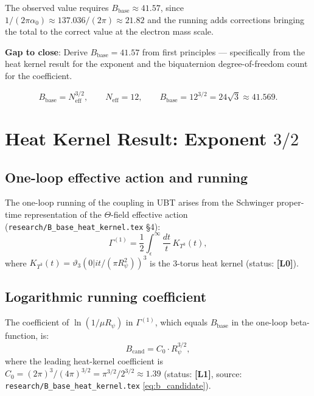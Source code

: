 \documentclass[11pt,a4paper]{article}
\newcommand{\Lzero}{\textbf{[L0]}}
\newcommand{\Lone}{\textbf{[L1]}}
\begin{document}
The observed value requires $B_{\mathrm{base}}\approx 41.57$, since
$1/(2\pi\alpha_0)\approx 137.036/(2\pi)\approx 21.82$ and the running
adds corrections bringing the total to the correct value at the electron
mass scale.

\medskip
\noindent\textbf{Gap to close}: Derive $B_{\mathrm{base}} = 41.57$ from first
principles — specifically from the heat kernel result for the exponent and
the biquaternion degree-of-freedom count for the coefficient.

\begin{tcolorbox}[colback=blue!5!white,colframe=blue!50!black,
  title=Main Result (proved at level \Lone)]
  \[
    B_{\mathrm{base}}
    = N_{\mathrm{eff}}^{3/2},
    \qquad
    N_{\mathrm{eff}} = 12,
    \qquad
    B_{\mathrm{base}} = 12^{3/2} = 24\sqrt{3} \approx 41.569.
  \]
\end{tcolorbox}

\section{Heat Kernel Result: Exponent $3/2$}
\label{sec:heat_kernel}

\subsection{One-loop effective action and running}

The one-loop running of the coupling in UBT arises from the Schwinger
proper-time representation of the $\Theta$-field effective action
(\texttt{research/B\_base\_heat\_kernel.tex} §4):
\begin{equation}
\label{eq:schwinger}
  \Gamma^{(1)}
  = \frac{1}{2}\int_\epsilon^\infty \frac{dt}{t}\,K_{T^3}(t),
\end{equation}
where $K_{T^3}(t)=\vartheta_3(0|it/(\pi R_\psi^2))^3$ is the 3-torus
heat kernel (status: \Lzero).

\subsection{Logarithmic running coefficient}

The coefficient of $\ln(1/\mu R_\psi)$ in $\Gamma^{(1)}$, which equals
$B_{\mathrm{base}}$ in the one-loop beta-function, is:
\begin{equation}
\label{eq:b_candidate}
  B_{\mathrm{cand}}
  = C_0 \cdot R_\psi^{3/2},
\end{equation}
where the leading heat-kernel coefficient is
$C_0 = (2\pi)^3/(4\pi)^{3/2} = \pi^{3/2}/2^{3/2}\approx 1.39$
(status: \Lone, source: \texttt{research/B\_base\_heat\_kernel.tex}
\eqref{eq:b_candidate}).
\end{document}
